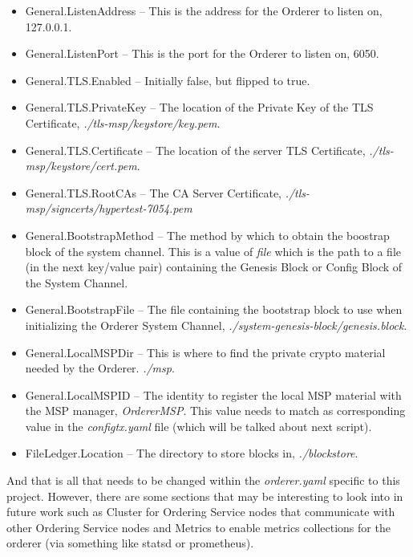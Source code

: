 \begin{itemize}
						\begin{itemize}
							\item General.ListenAddress -- This is the address for the Orderer to listen on, 127.0.0.1.
							\item General.ListenPort -- This is the port for the Orderer to listen on, 6050.
							\item General.TLS.Enabled -- Initially false, but flipped to true.
							\item General.TLS.PrivateKey -- The location of the Private Key of the TLS Certificate, \textit{./tls-msp/keystore/key.pem}.
							\item General.TLS.Certificate -- The location of the server TLS Certificate, \textit{./tls-msp/keystore/cert.pem}.
							\item General.TLS.RootCAs -- The CA Server Certificate, \textit{./tls-msp/signcerts/hypertest-7054.pem}
							\item General.BootstrapMethod -- The method by which to obtain the boostrap block of the system channel. This is a value of \textit{file} which is the path to a file (in the next key/value pair) containing the Genesis Block or Config Block of the System Channel.
							\item General.BootstrapFile -- The file containing the bootstrap block to use when initializing the Orderer System Channel, \textit{./system-genesis-block/genesis.block}.
							\item General.LocalMSPDir -- This is where to find the private crypto material needed by the Orderer. \textit{./msp}.
							\item General.LocalMSPID -- The identity to register the local MSP material with the MSP manager, \textit{OrdererMSP}. This value needs to match as corresponding value in the \textit{configtx.yaml} file (which will be talked about next script).
							\item FileLedger.Location -- The directory to store blocks in, \textit{./blockstore}.
						\end{itemize}
						
					\hspace{10mm}And that is all that needs to be changed within the \textit{orderer.yaml} specific to this project. However, there are some sections that may be interesting to look into in future work such as Cluster for Ordering Service nodes that communicate with other Ordering Service nodes and Metrics to enable metrics collections for the orderer (via something like statsd or prometheus).
					

\end{itemize}
